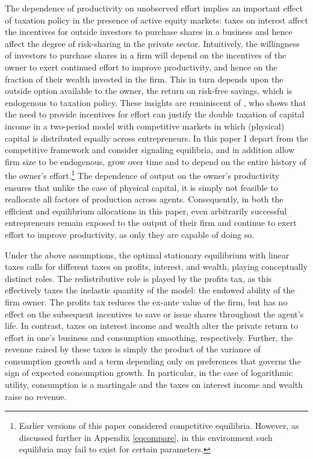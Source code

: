 \documentclass[11pt]{article}
\theoremstyle{plain}
\begin{document}
The dependence of productivity on unobserved effort implies an important effect of taxation policy in the presence of active equity markets: taxes on interest affect the incentives for outside investors to purchase shares in a business and hence affect the degree of risk-sharing in the private sector. Intuitively, the willingness of investors to purchase shares in a firm will depend on the incentives of the owner to exert continued effort to improve productivity, and hence on the fraction of their wealth invested in the firm. This in turn depends upon the outside option available to the owner, the return on risk-free savings, which is endogenous to taxation policy. These insights are reminiscent of \cite{albanesi_optimal_2006}, who shows that the need to provide incentives for effort can justify the double taxation of capital income in a two-period model with competitive markets in which (physical) capital is distributed equally across entrepreneurs. In this paper I depart from the competitive framework and consider signaling equilibria, and in addition allow firm size to be endogenous, grow over time and to depend on the entire history of the owner's effort.\footnote{Earlier versions of this paper considered competitive equilibria. However, as discussed further in Appendix \ref{eqcompare}, in this environment such equilibria may fail to exist for certain parameters.} The dependence of output on the owner's productivity ensures that unlike the case of physical capital, it is simply not feasible to reallocate all factors of production across agents. Consequently, in both the efficient and equilibrium allocations in this paper, even arbitrarily successful entrepreneurs remain exposed to the output of their firm and continue to exert effort to improve productivity, as only they are capable of doing so. 


Under the above assumptions, the optimal stationary equilibrium with linear taxes calls for different taxes on profits, interest, and wealth, playing conceptually distinct roles. The redistributive role is played by the profits tax, as this effectively taxes the inelastic quantity of the model: the endowed ability of the firm owner. The profits tax reduces the ex-ante value of the firm, but has no effect on the subsequent incentives to save or issue shares throughout the agent's life. In contrast, taxes on interest income and wealth alter the private return to effort in one's business and consumption smoothing, respectively. Further, the revenue raised by these taxes is simply the product of the variance of consumption growth and a term depending only on preferences that governs the sign of expected consumption growth. In particular, in the case of logarithmic utility, consumption is a martingale and the taxes on interest income and wealth raise no revenue. 
\end{document}
